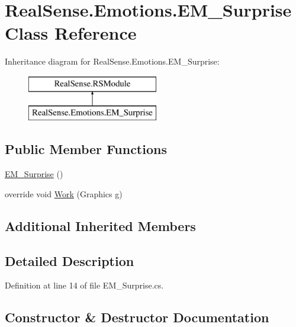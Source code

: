 \hypertarget{class_real_sense_1_1_emotions_1_1_e_m___surprise}{}\section{Real\+Sense.\+Emotions.\+E\+M\+\_\+\+Surprise Class Reference}
\label{class_real_sense_1_1_emotions_1_1_e_m___surprise}
Inheritance diagram for Real\+Sense.\+Emotions.\+E\+M\+\_\+\+Surprise\+:\begin{figure}[H]
\begin{center}
\leavevmode
\includegraphics[height=2.000000cm]{class_real_sense_1_1_emotions_1_1_e_m___surprise}
\end{center}
\end{figure}
\subsection*{Public Member Functions}
\begin{DoxyCompactItemize}
\item 
\hyperlink{class_real_sense_1_1_emotions_1_1_e_m___surprise_a95c89a129f31134f35b0d34a212e7d29}{E\+M\+\_\+\+Surprise} ()
\item 
override void \hyperlink{class_real_sense_1_1_emotions_1_1_e_m___surprise_a08040934bb081596a4b02b483dc3a662}{Work} (Graphics g)
\end{DoxyCompactItemize}
\subsection*{Additional Inherited Members}


\subsection{Detailed Description}


Definition at line 14 of file E\+M\+\_\+\+Surprise.\+cs.



\subsection{Constructor \& Destructor Documentation}
\mbox{\label{class_real_sense_1_1_emotions_1_1_e_m___surprise_a95c89a129f31134f35b0d34a212e7d29}} 
